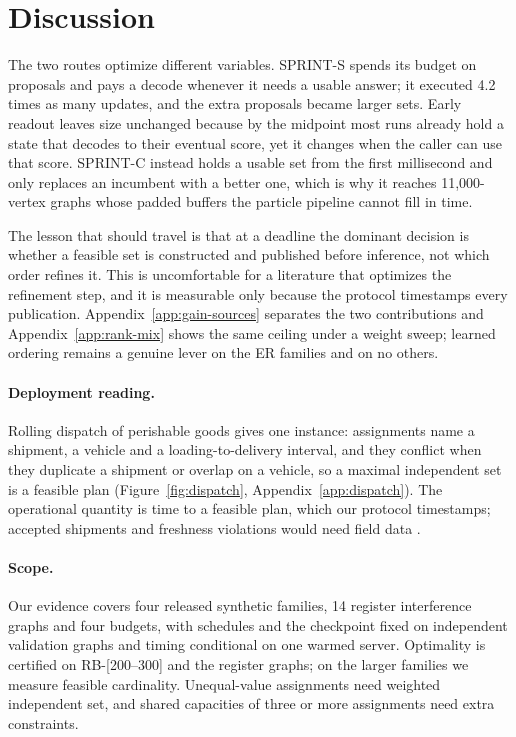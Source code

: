 \section{Discussion}

The two routes optimize different variables. SPRINT-S spends its budget on proposals and pays a decode whenever it needs a usable answer; it executed 4.2 times as many updates, and the extra proposals became larger sets. Early readout leaves size unchanged because by the midpoint most runs already hold a state that decodes to their eventual score, yet it changes when the caller can use that score. SPRINT-C instead holds a usable set from the first millisecond and only replaces an incumbent with a better one, which is why it reaches 11,000-vertex graphs whose padded buffers the particle pipeline cannot fill in time.

The lesson that should travel is that at a deadline the dominant decision is whether a feasible set is constructed and published before inference, not which order refines it. This is uncomfortable for a literature that optimizes the refinement step, and it is measurable only because the protocol timestamps every publication. Appendix~\ref{app:gain-sources} separates the two contributions and Appendix~\ref{app:rank-mix} shows the same ceiling under a weight sweep; learned ordering remains a genuine lever on the ER families and on no others.

\paragraph{Deployment reading.}
Rolling dispatch of perishable goods gives one instance: assignments name a shipment, a vehicle and a loading-to-delivery interval, and they conflict when they duplicate a shipment or overlap on a vehicle, so a maximal independent set is a feasible plan (Figure~\ref{fig:dispatch}, Appendix~\ref{app:dispatch}). The operational quantity is time to a feasible plan, which our protocol timestamps; accepted shipments and freshness violations would need field data \citep{zhang2020coldchain,stellingwerf2021quality}.

\paragraph{Scope.}
Our evidence covers four released synthetic families, 14 register interference graphs and four budgets, with schedules and the checkpoint fixed on independent validation graphs and timing conditional on one warmed server. Optimality is certified on RB-[200--300] and the register graphs; on the larger families we measure feasible cardinality. Unequal-value assignments need weighted independent set, and shared capacities of three or more assignments need extra constraints.
